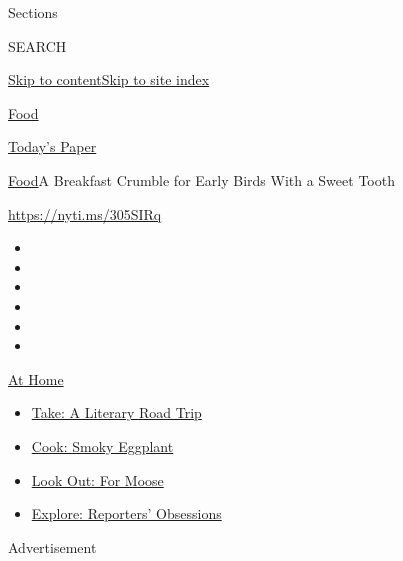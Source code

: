 Sections

SEARCH

\protect\hyperlink{site-content}{Skip to
content}\protect\hyperlink{site-index}{Skip to site index}

\href{https://www.nytimes.com/section/food}{Food}

\href{https://myaccount.nytimes.com/auth/login?response_type=cookie\&client_id=vi}{}

\href{https://www.nytimes.com/section/todayspaper}{Today's Paper}

\href{/section/food}{Food}\textbar{}A Breakfast Crumble for Early Birds
With a Sweet Tooth

\url{https://nyti.ms/305SIRq}

\begin{itemize}
\item
\item
\item
\item
\item
\item
\end{itemize}

\href{https://www.nytimes.com/spotlight/at-home?action=click\&pgtype=Article\&state=default\&region=TOP_BANNER\&context=at_home_menu}{At
Home}

\begin{itemize}
\tightlist
\item
  \href{https://www.nytimes.com/2020/07/28/books/time-for-a-literary-road-trip.html?action=click\&pgtype=Article\&state=default\&region=TOP_BANNER\&context=at_home_menu}{Take:
  A Literary Road Trip}
\item
  \href{https://www.nytimes.com/2020/07/29/magazine/bored-with-your-home-cooking-some-smoky-eggplant-will-fix-that.html?action=click\&pgtype=Article\&state=default\&region=TOP_BANNER\&context=at_home_menu}{Cook:
  Smoky Eggplant}
\item
  \href{https://www.nytimes.com/2020/07/27/travel/moose-michigan-isle-royale.html?action=click\&pgtype=Article\&state=default\&region=TOP_BANNER\&context=at_home_menu}{Look
  Out: For Moose}
\item
  \href{https://www.nytimes.com/interactive/2020/at-home/even-more-reporters-editors-diaries-lists-recommendations.html?action=click\&pgtype=Article\&state=default\&region=TOP_BANNER\&context=at_home_menu}{Explore:
  Reporters' Obsessions}
\end{itemize}

Advertisement

